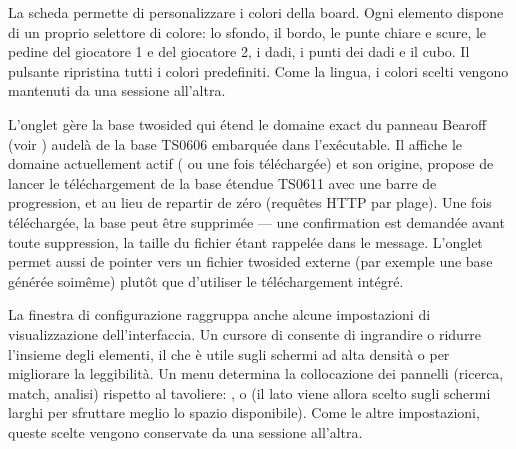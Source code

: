 \documentclass[letterpaper,10pt,italian]{sphinxmanual}
\begin{document}
\sphinxAtStartPar
La scheda  permette di personalizzare i colori della board. Ogni elemento dispone di un proprio selettore di colore: lo sfondo, il bordo, le punte chiare e scure, le pedine del giocatore 1 e del giocatore 2, i dadi, i punti dei dadi e il cubo. Il pulsante  ripristina tutti i colori predefiniti. Come la lingua, i colori scelti vengono mantenuti da una sessione all’altra.

\sphinxAtStartPar
L’onglet  gère la base two\sphinxhyphen{}sided qui étend le domaine exact du
panneau Bearoff (voir {\hyperref[\detokenize{manuel:panneau-epc}]{}}) au\sphinxhyphen{}delà de la base TS\sphinxhyphen{}06\sphinxhyphen{}06
embarquée dans l’exécutable. Il affiche le domaine actuellement actif
( ou  une fois téléchargée) et son origine, propose de
lancer le téléchargement de la base étendue TS\sphinxhyphen{}06\sphinxhyphen{}11 avec une barre de
progression, et  au
lieu de repartir de zéro (requêtes HTTP par plage). Une fois téléchargée, la
base peut être supprimée — une confirmation est demandée avant toute
suppression, la taille du fichier étant rappelée dans le message. L’onglet
permet aussi de pointer vers un fichier  two\sphinxhyphen{}sided externe (par exemple
une base générée soi\sphinxhyphen{}même) plutôt que d’utiliser le téléchargement intégré.

\sphinxAtStartPar
La finestra di configurazione raggruppa anche alcune impostazioni di visualizzazione dell’interfaccia. Un cursore di  consente di ingrandire o ridurre l’insieme degli elementi, il che è utile sugli schermi ad alta densità o per migliorare la leggibilità. Un menu  determina la collocazione dei pannelli (ricerca, match, analisi) rispetto al tavoliere: ,  o  (il lato viene allora scelto sugli schermi larghi per sfruttare meglio lo spazio disponibile). Come le altre impostazioni, queste scelte vengono conservate da una sessione all’altra.
\end{document}

